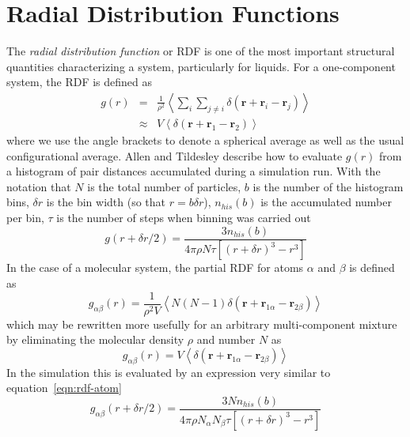 \section{Radial Distribution Functions}%
\label{sec:rdf}
The {\em radial distribution function\/} or RDF is one of the most
important structural quantities characterizing a system, particularly
for liquids.  For a one-component system, the RDF is defined
as\cite[p445]{hansen:86}
\begin{eqnarray}
g(r) & = & \frac{1}{\rho^2} \left < \sum_i \sum_{j\neq i}
\delta(\bm{r} + \bm{r}_i - \bm{r}_j) \right > \\ \nonumber
 &  \approx  & V \left < \delta(\bm{r} + \bm{r}_1 - \bm{r}_2) \right >
\end{eqnarray}
where we use the angle brackets to denote a spherical average as well
as the usual configurational average.  Allen and
Tildesley\cite[pp184,185]{allen:87} describe how to evaluate $g(r)$
from a histogram of pair distances accumulated during a simulation
run. With the notation that $N$ is the total number of particles, $b$
is the number of the histogram bins, $\delta r$ is the bin width (so
that $r = b \delta r$), $n_{his}(b)$ is the accumulated number per
bin, $\tau$ is the number of steps when binning was carried out
\begin{equation}
\label{eqn:rdf-atom}
g(r + \delta r/2) = \frac{3 n_{his}(b)}{4 \pi \rho N \tau [(r + \delta r)^3 - r^3]}
\end{equation}
In the case of a molecular system, the partial RDF for atoms
$\alpha$ and $\beta$ is defined as\cite[p 445]{hansen:86}
\begin{equation}
g_{\alpha \beta}(r) = \frac{1}{\rho^2 V} \left < N(N-1)\delta(\bm{r} + \bm{r}_{1\alpha} - \bm{r}_{2\beta}) \right >
\end{equation}
which may be rewritten more usefully for an arbitrary multi-component
mixture by eliminating the molecular density $\rho$ and number $N$ as
\begin{equation}
g_{\alpha \beta}(r) = V \left < \delta(\bm{r} +  \bm{r}_{1\alpha} - \bm{r}_{2\beta}) \right >
\end{equation}
In the simulation this is evaluated by an expression very similar to
equation~\ref{eqn:rdf-atom}
\begin{equation}
\label{eqn:rdf-site}
g_{\alpha \beta}(r + \delta r/2) = \frac{3 N n_{his}(b)}{4 \pi
\rho N_\alpha N_\beta \tau [(r + \delta r)^3 - r^3]}
\end{equation}

